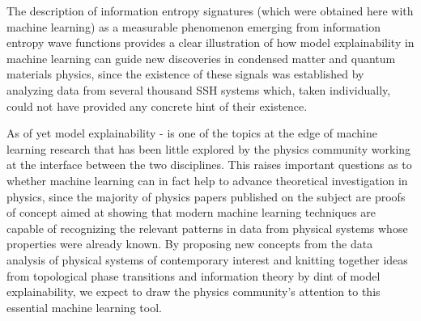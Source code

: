 \documentclass[10pt]{revtex4-1}
\newcommand{\citequote}[1]{\ref{#1}}
\begin{document}
The  description of information entropy signatures (which were obtained here with machine learning) as a measurable phenomenon emerging from information entropy wave functions provides a clear illustration of how model explainability in machine learning can guide new discoveries in condensed matter and quantum materials physics, since the existence of these signals was established by analyzing data from several thousand SSH systems which, taken individually, could not have provided any concrete hint of their existence.%

As of yet model explainability \cite{gilpin2018explaining}-\cite{roscher2020explainable} is one of the topics at the edge of machine learning research that has been little explored by the physics community working at the interface between the two disciplines. This raises important questions as to whether machine learning can in fact help to advance theoretical investigation in physics, since the majority of physics papers published on the subject are proofs of concept aimed at showing that modern machine learning techniques are capable of recognizing the relevant patterns in data from physical systems whose properties were already known. By proposing new concepts from the data analysis of physical systems of contemporary interest and knitting together ideas from topological phase transitions and information theory by dint of model explainability, we expect to draw the physics community's attention to this essential machine learning tool. 
\end{document}
